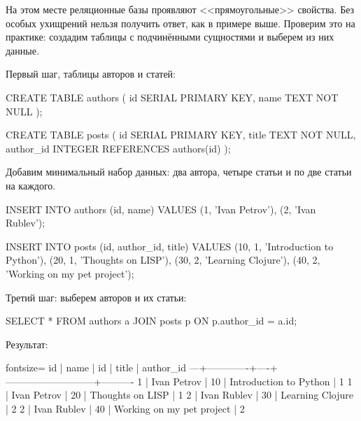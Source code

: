 На этом месте реляционные базы проявляют <<прямоугольные>> свойства. Без особых ухищрений нельзя получить ответ, как в примере выше. Проверим это на практике: создадим таблицы с подчинёнными сущностями и выберем из них данные.

Первый шаг, таблицы авторов и статей:

\begin{english}
  \begin{sql}
CREATE TABLE authors (
  id SERIAL PRIMARY KEY,
  name TEXT NOT NULL
);

CREATE TABLE posts (
  id SERIAL PRIMARY KEY,
  title TEXT NOT NULL,
  author_id INTEGER REFERENCES authors(id)
);
  \end{sql}
\end{english}

Добавим минимальный набор данных: два автора, четыре статьи и по две статьи на каждого.

\begin{english}
  \begin{sql}
INSERT INTO authors (id, name) VALUES
  (1, 'Ivan Petrov'),
  (2, 'Ivan Rublev');

INSERT INTO posts (id, author_id, title) VALUES
  (10, 1, 'Introduction to Python'),
  (20, 1, 'Thoughts on LISP'),
  (30, 2, 'Learning Clojure'),
  (40, 2, 'Working on my pet project');
  \end{sql}
\end{english}

Третий шаг: выберем авторов и их статьи:

\begin{english}
  \begin{sql}
SELECT *
FROM authors a
JOIN posts p
  ON p.author_id = a.id;
  \end{sql}
\end{english}

\pagebreaklarge

Результат:

\begin{english}
  \begin{text*}{fontsize=\small}
id |    name     | id |            title          | author_id
---+-------------+----+---------------------------+----------
 1 | Ivan Petrov | 10 | Introduction to Python    |         1
 1 | Ivan Petrov | 20 | Thoughts on LISP          |         1
 2 | Ivan Rublev | 30 | Learning Clojure          |         2
 2 | Ivan Rublev | 40 | Working on my pet project |         2
  \end{text*}
\end{english}

